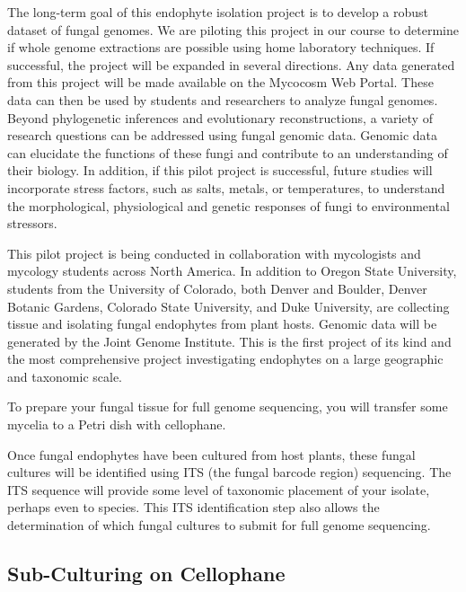 \documentclass[
  letterpaper,
  DIV=11,
  numbers=noendperiod]{scrreprt}
\begin{document}
The long-term goal of this endophyte isolation project is to develop a
robust dataset of fungal genomes. We are piloting this project in our
course to determine if whole genome extractions are possible using home
laboratory techniques. If successful, the project will be expanded in
several directions. Any data generated from this project will be made
available on the Mycocosm Web Portal. These data can then be used by
students and researchers to analyze fungal genomes. Beyond phylogenetic
inferences and evolutionary reconstructions, a variety of research
questions can be addressed using fungal genomic data. Genomic data can
elucidate the functions of these fungi and contribute to an
understanding of their biology. In addition, if this pilot project is
successful, future studies will incorporate stress factors, such as
salts, metals, or temperatures, to understand the morphological,
physiological and genetic responses of fungi to environmental stressors.

This pilot project is being conducted in collaboration with mycologists
and mycology students across North America. In addition to Oregon State
University, students from the University of Colorado, both Denver and
Boulder, Denver Botanic Gardens, Colorado State University, and Duke
University, are collecting tissue and isolating fungal endophytes from
plant hosts. Genomic data will be generated by the Joint Genome
Institute. This is the first project of its kind and the most
comprehensive project investigating endophytes on a large geographic and
taxonomic scale.

To prepare your fungal tissue for full genome sequencing, you will
transfer some mycelia to a Petri dish with cellophane.

Once fungal endophytes have been cultured from host plants, these fungal
cultures will be identified using ITS (the fungal barcode region)
sequencing. The ITS sequence will provide some level of taxonomic
placement of your isolate, perhaps even to species. This ITS
identification step also allows the determination of which fungal
cultures to submit for full genome sequencing.

\subsection*{Sub-Culturing on
Cellophane}\label{sub-culturing-on-cellophane}
\end{document}
